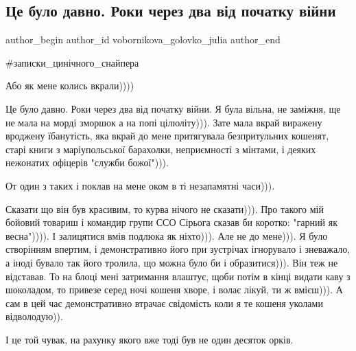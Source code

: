  
 
 
 
 
 
\subsection{Це було давно. Роки через два від початку війни}
\label{sec:12_08_2023.fb.vobornikova_golovko_julia.1.ce_bulo_davno}
 
\ifcmt
 author_begin
   author_id vobornikova_golovko_julia
 author_end
\fi

\#записки\_цинічного\_снайпера

Або як мене колись вкрали))))

Це було давно. Роки через два від початку війни. Я була вільна, не заміжня, ще
не мала на морді зморшок а на попі цілюліту))). Зате мала вкрай виражену
вроджену їбанутість, яка вкрай до мене притягувала безпритульних кошенят, старі
книги з маріупольської барахолки, неприємності з мінтами, і деяких нежонатих
офіцерів "служби божої"))).

От один з таких і поклав на мене оком в ті незапамятні часи))).

Сказати що він був красивим, то курва нічого не сказати))). Про такого мій
бойовий товариш і командир групи ССО Сірьога сказав би коротко: "гарний як
весна")))). І залицятися вмів подлюка як ніхто))). Але не до мене))). Я було
створінням впертим, і демонстративно його при зустрічах ігнорувало і зневажало,
а іноді бувало так його тролила, що можна було би і образитися))).  Він теж не
відставав. То на блоці мені затримання влаштує, щоби потім в кінці видати каву
з шоколадом,  то привезе серед ночі кошеня хворе, і волає лікуй, ти ж вмієш))).
А сам в цей час демонстративно втрачає свідомість коли я те кошеня уколами
відволодую)).

І це той чувак, на рахунку якого вже тоді був не один десяток орків.

